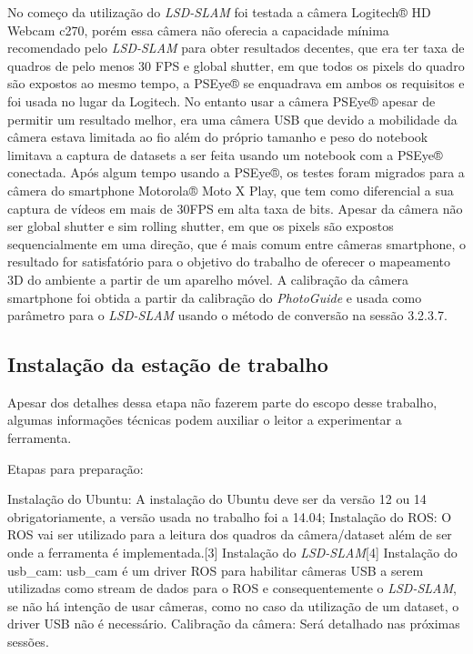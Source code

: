 No começo da utilização do \textit{LSD-SLAM} foi testada a câmera Logitech® HD Webcam c270, porém essa câmera não oferecia a capacidade mínima recomendado pelo \textit{LSD-SLAM} para obter resultados decentes, que era ter taxa de quadros de pelo menos 30 FPS e global shutter, em que todos os pixels do quadro são expostos ao mesmo tempo, a PSEye® se enquadrava em ambos os requisitos e foi usada no lugar da Logitech. No entanto usar a câmera PSEye® apesar de permitir um resultado melhor, era uma câmera USB que devido a mobilidade da câmera estava limitada ao fio além do próprio tamanho e peso do notebook limitava a captura de datasets a ser feita usando um notebook com a PSEye® conectada. Após algum tempo usando a PSEye®, os testes foram migrados para a câmera do smartphone Motorola® Moto X Play, que tem como diferencial a sua captura de vídeos em mais de 30FPS em alta taxa de bits. Apesar da câmera não ser global shutter e sim rolling shutter, em que os pixels são expostos sequencialmente em uma direção, que é mais comum entre câmeras smartphone, o resultado for satisfatório para o objetivo do trabalho de oferecer o mapeamento 3D do ambiente a partir de um aparelho móvel. A calibração da câmera smartphone foi obtida a partir da calibração do \textit{PhotoGuide} e usada como parâmetro para o \textit{LSD-SLAM} usando o método de conversão na sessão 3.2.3.7.

\subsection{Instalação da estação de trabalho}

Apesar dos detalhes dessa etapa não fazerem parte do escopo desse trabalho, algumas informações técnicas podem auxiliar o leitor a experimentar a ferramenta.

Etapas para preparação:

Instalação do Ubuntu: A instalação do Ubuntu deve ser da versão 12 ou 14 obrigatoriamente, a versão usada no trabalho foi a 14.04;
Instalação do  ROS: O ROS vai ser utilizado para a leitura dos quadros da câmera/dataset além de ser onde a ferramenta é implementada.[3]
Instalação do \textit{LSD-SLAM}[4]
Instalação do  usb\_cam: usb\_cam é um driver ROS para habilitar câmeras USB a serem utilizadas como stream de dados para o ROS e consequentemente o \textit{LSD-SLAM}, se não há intenção de usar câmeras, como no caso da utilização de um dataset, o driver USB não é necessário.
Calibração da câmera: Será detalhado nas próximas sessões.

